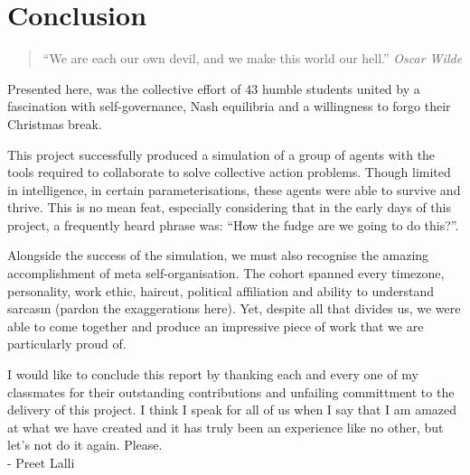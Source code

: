 \chapter{Conclusion}


\begin{flushleft}
    \begin{quote}
        ``We are each our own devil, and we make this world our hell.''
        \linebreak
        \emph{Oscar Wilde}
    \end{quote}
\end{flushleft}

Presented here, was the collective effort of 43 humble students united by a fascination with self-governance, Nash equilibria and a willingness to forgo their Christmas break. 

This project successfully produced a simulation of a group of agents with the tools required to collaborate to solve collective action problems. Though limited in intelligence, in certain parameterisations, these agents were able to survive and thrive. This is no mean feat, especially considering that in the early days of this project, a frequently heard phrase was: ``How the fudge are we going to do this?''.

Alongside the success of the simulation, we must also recognise the amazing accomplishment of meta self-organisation. The cohort spanned every timezone, personality, work ethic, haircut, political affiliation and ability to understand sarcasm (pardon the exaggerations here). Yet, despite all that divides us, we were able to come together and produce an impressive piece of work that we are particularly proud of. 

I would like to conclude this report by thanking each and every one of my classmates for their outstanding contributions and unfailing committment to the delivery of this project. I think I speak for all of us when I say that I am amazed at what we have created and it has truly been an experience like no other, but let's not do it again. Please. \\
- Preet Lalli
